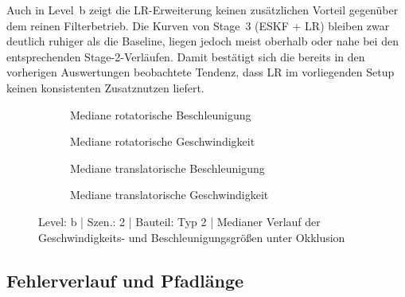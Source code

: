 Auch in Level~b zeigt die \ac{LR}-Erweiterung keinen zusätzlichen Vorteil gegenüber dem reinen Filterbetrieb. Die Kurven von Stage~3 (ESKF + LR) bleiben zwar deutlich ruhiger als die Baseline, liegen jedoch meist oberhalb oder nahe bei den entsprechenden Stage-2-Verläufen. Damit bestätigt sich die bereits in den vorherigen Auswertungen beobachtete Tendenz, dass \ac{LR} im vorliegenden Setup keinen konsistenten Zusatznutzen liefert.

\begin{figure}[htbp]
    \centering
    \begin{subfigure}[b]{0.49\textwidth}
        \caption{Mediane rotatorische Beschleunigung}
        \label{fig:b_2_Typ2_timeseries_median_ibvs_ang_acc_l2}
    \end{subfigure}
    \hfill
    \begin{subfigure}[b]{0.49\textwidth}
        \caption{Mediane rotatorische Geschwindigkeit}
        \label{fig:b_2_Typ2_timeseries_median_ibvs_ang_vel_l2}
    \end{subfigure}

    \vfill

    \begin{subfigure}[b]{0.49\textwidth}
        \caption{Mediane translatorische Beschleunigung}
        \label{fig:b_2_Typ2_timeseries_median_ibvs_lin_acc_l2}
    \end{subfigure}
    \hfill
    \begin{subfigure}[b]{0.49\textwidth}
        \caption{Mediane translatorische Geschwindigkeit}
        \label{fig:b_2_Typ2_timeseries_median_ibvs_lin_vel_l2}
    \end{subfigure}
    \caption{Level: b | Szen.: 2 | Bauteil: Typ 2 | Medianer Verlauf der Geschwindigkeits- und Beschleunigungsgrößen unter Okklusion}
    \label{fig:b_2_typ2_vel_acc}
\end{figure}

\subsection{Fehlerverlauf und Pfadlänge}

